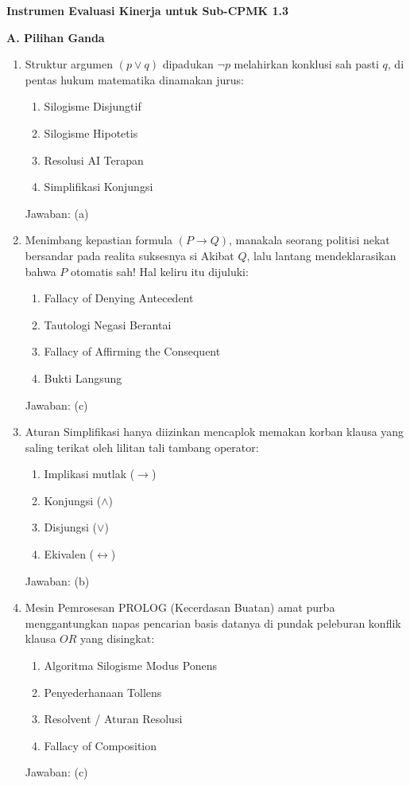 \documentclass[../main]{subfiles}
\begin{document}
\begin{asesmen}
\textbf{Instrumen Evaluasi Kinerja untuk Sub-CPMK 1.3}

\textbf{A. Pilihan Ganda}
\begin{enumerate}
  \item Struktur argumen $(p \lor q)$ dipadukan $\neg p$ melahirkan konklusi sah pasti $q$, di pentas hukum matematika dinamakan jurus:
  \begin{enumerate}
    \item Silogisme Disjungtif
    \item Silogisme Hipotetis
    \item Resolusi AI Terapan
    \item Simplifikasi Konjungsi
  \end{enumerate}
  Jawaban: (a)

  \item Menimbang kepastian formula $(P \rightarrow Q)$, manakala seorang politisi nekat bersandar pada realita suksesnya si Akibat $Q$, lalu lantang mendeklarasikan bahwa $P$ otomatis sah! Hal keliru itu dijuluki:
  \begin{enumerate}
    \item Fallacy of Denying Antecedent
    \item Tautologi Negasi Berantai
    \item Fallacy of Affirming the Consequent
    \item Bukti Langsung 
  \end{enumerate}
  Jawaban: (c)

  \item Aturan Simplifikasi hanya diizinkan mencaplok memakan korban klausa yang saling terikat oleh lilitan tali tambang operator:
  \begin{enumerate}
    \item Implikasi mutlak ($\rightarrow$)
    \item Konjungsi ($\land$)
    \item Disjungsi ($\lor$)
    \item Ekivalen ($\leftrightarrow$)
  \end{enumerate}
  Jawaban: (b)

  \item Mesin Pemrosesan PROLOG (Kecerdasan Buatan) amat purba menggantungkan napas pencarian basis datanya di pundak peleburan konflik klausa $OR$ yang disingkat:
  \begin{enumerate}
    \item Algoritma Silogisme Modus Ponens
    \item Penyederhanaan Tollens
    \item Resolvent / Aturan Resolusi
    \item Fallacy of Composition
  \end{enumerate}
  Jawaban: (c)
\end{enumerate}


\end{asesmen}
\end{document}
